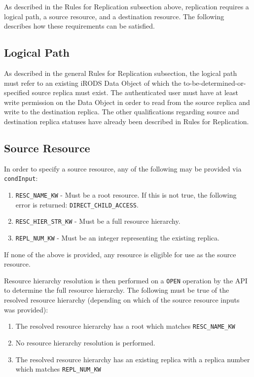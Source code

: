 \documentclass{irodsugm}
\begin{document}
As described in the Rules for Replication subsection above, replication requires a logical path, a source resource, and a destination resource. The following describes how these requirements can be satisfied.

\subsection*{Logical Path}
As described in the general Rules for Replication subsection, the logical path must refer to an existing iRODS Data Object of which the to-be-determined-or-specified source replica must exist. The authenticated user must have at least write permission on the Data Object in order to read from the source replica and write to the destination replica. The other qualifications regarding source and destination replica statuses have already been described in Rules for Replication.

\subsection*{Source Resource}
In order to specify a source resource, any of the following may be provided via \texttt{condInput}:

\begin{enumerate}
    \item \texttt{RESC\_NAME\_KW} - Must be a root resource. If this is not true, the following error is returned: \texttt{DIRECT\_CHILD\_ACCESS}.
    \item \texttt{RESC\_HIER\_STR\_KW} - Must be a full resource hierarchy.
    \item \texttt{REPL\_NUM\_KW} - Must be an integer representing the existing replica.
\end{enumerate}

If none of the above is provided, any resource is eligible for use as the source resource.

Resource hierarchy resolution is then performed on a \texttt{OPEN} operation by the API to determine the full resource hierarchy. The following must be true of the resolved resource hierarchy (depending on which of the source resource inputs was provided):

\begin{enumerate}
    \item The resolved resource hierarchy has a root which matches \texttt{RESC\_NAME\_KW}
    \item No resource hierarchy resolution is performed.
    \item The resolved resource hierarchy has an existing replica with a replica number which matches \texttt{REPL\_NUM\_KW}
\end{enumerate}
\end{document}

